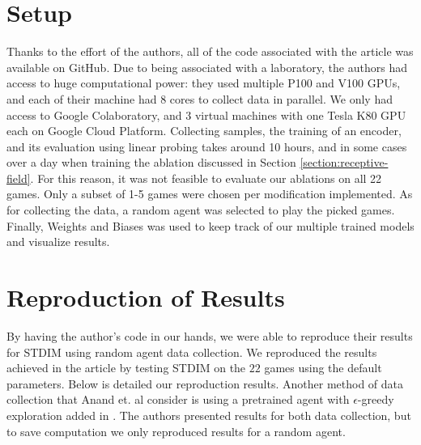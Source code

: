 \documentclass{article}
\begin{document}
\section{Setup}
Thanks to the effort of the authors, all of the code associated with the article was available on GitHub. Due to being associated with a laboratory, the authors had access to huge computational power: they used multiple P100 and V100 GPUs, and each of their machine had 8 cores to collect data in parallel. We only had access to Google Colaboratory, and 3 virtual machines with one Tesla K80 GPU each on Google Cloud Platform. Collecting samples, the training of an encoder, and its evaluation using linear probing takes around 10 hours, and in some cases over a day when training the ablation discussed in Section \ref{section:receptive-field}. For this reason, it was not feasible to evaluate our ablations on all 22 games. Only a subset of 1-5 games were chosen per modification implemented. As for collecting the data, a random agent was selected to play the picked games. Finally, Weights and Biases was used to keep track of our multiple trained models and visualize results.

\section{Reproduction of Results}
By having the author's code in our hands, we were able to reproduce their results for STDIM using random agent data collection. We reproduced the results achieved in the article by testing STDIM on the $22$ games using the default parameters. Below is detailed our reproduction results. Another method of data collection that Anand et. al consider is using a pretrained agent with $\epsilon$-greedy exploration added in \cite{main_article}. The authors presented results for both data collection, but to save computation we only reproduced results for a random agent.
\end{document}
